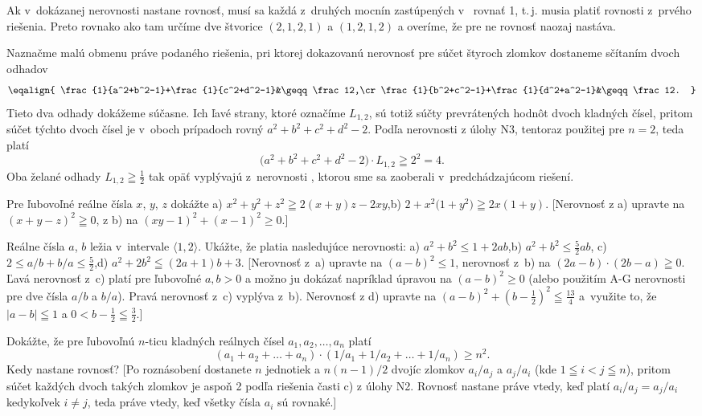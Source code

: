{Ak v~dokázanej nerovnosti nastane rovnosť, musí sa každá
z~druhých mocnín zastúpených v~ rovnať 1, t.\,j. musia platiť rovnosti
 z~prvého riešenia. Preto rovnako ako tam určíme
dve štvorice $(2, 1, 2, 1)$
a $(1, 2, 1, 2)$ a overíme, že pre ne rovnosť naozaj nastáva.

\poznamka
Naznačme malú obmenu práve podaného riešenia,
pri ktorej dokazovanú nerovnosť pre súčet štyroch zlomkov
dostaneme sčítaním dvoch odhadov
$$\eqalign{
\frac{1}{a^2+b^2-1}+\frac{1}{c^2+d^2-1}&\geqq\frac12,\cr
\frac{1}{b^2+c^2-1}+\frac{1}{d^2+a^2-1}&\geqq\frac12.
}$$
Tieto dva odhady dokážeme súčasne. Ich ľavé strany, ktoré
označíme $L_{1,2}$, sú totiž súčty prevrátených hodnôt
dvoch kladných čísel, pritom súčet týchto dvoch čísel
je v~oboch prípadoch rovný $a^2+b^2+c^2+d^2-2$.
Podľa nerovnosti z úlohy N3, tentoraz použitej pre $n=2$,
teda platí
$$
\bigl(a^2+b^2+c^2+d^2-2\bigr)\cdot L_{1,2}\geqq 2^2=4.
$$
Oba želané odhady $L_{1,2}\geqq\frac12$ tak opäť vyplývajú z~nerovnosti
, ktorou sme sa zaoberali v~predchádzajúcom riešení.


Pre ľubovoľné reálne čísla $x$, $y$, $z$ dokážte\hfil\break
a) $x^2+y^2+z^2\geqq2(x+y)z-2xy$,\quad b) $2+x^2\bigl(1+y^2\bigr)\geqq2x(1 +y)$.\hfil{}
[Nerovnosť z a) upravte na $(x+y-z)^2\geqq0$, z b) na
$(xy-1)^2+(x-1)^2\geq0$.]

Reálne čísla $a$, $b$ ležia v~intervale $\langle 1, 2 \rangle$.
Ukážte, že platia nasledujúce nerovnosti:\hfil\break
a) $a^2 + b^2 \leq 1 + 2ab$,\qquad b) $a^2+ b^2 \leq \frac52 ab$,\hfil\break
c) $2\leq a/b+b/a\leq\frac52$,\qquad d) $a^2+2b^2\leqq(2a+1)b+3$. \hskip1cm\hfil{}
[Nerovnosť z~a) upravte na $(a-b)^2 \leq 1$, nerovnosť z~b)
na $(2a-b)\cdot(2b-a)\geqq0$. Ľavá nerovnosť z~c) platí
pre ľubovoľné $a,b>0$ a možno ju dokázať napríklad úpravou na
$(a-b)^2 \geq 0$ (alebo použitím A-G nerovnosti pre dve čísla $a/b$ a
$b/a$). Pravá nerovnosť z~c) vyplýva z~b). Nerovnosť z d) upravte
na $(a-b)^2+(b-\frac12)^2\leqq\frac{13}{4}$ a~využite to, že
$|a-b|\leqq1$ a $0<b-\frac12\leqq\frac32$.]

Dokážte, že pre ľubovoľnú $n$-ticu kladných reálnych čísel
$a_1,a_2,\dots,a_n$ platí
$$
(a_1+a_2+\ldots+a_n)\cdot
\left(1/a_1+ 1/a_2+\ldots+1/a_n\right)\geq n^2.
$$
Kedy nastane rovnosť?
[Po roznásobení dostanete $n$ jednotiek a $n(n-1)/2$ dvojíc zlomkov
$a_i/a_j$ a $a_j/a_i$ (kde $1\leqq i<j\leqq n$),
pritom súčet každých dvoch
takých zlomkov je aspoň 2 podľa riešenia časti c) z úlohy N2.
Rovnosť nastane práve vtedy, keď platí $a_i/a_j=a_j/a_i$ kedykoľvek $i\ne j$,
teda práve vtedy, keď všetky čísla $a_i$ sú rovnaké.]

}
